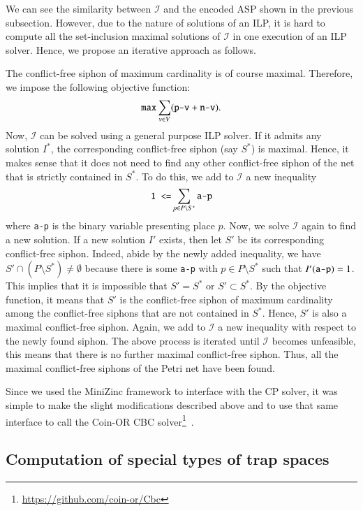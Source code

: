 \documentclass[preprint,12pt]{elsarticle}
\begin{document}
We can see the similarity between \(\mathcal{I}\) and the encoded ASP shown in the previous subsection.
However, due to the nature of solutions of an ILP, it is hard to compute all the set-inclusion maximal solutions of \(\mathcal{I}\) in one execution of an ILP solver.
Hence, we propose an iterative approach as follows.

The conflict-free siphon of maximum cardinality is of course maximal.
Therefore, we impose the following objective function:
\[
  \verb|max| \sum_{v \in V}(\verb|p-v| + \verb|n-v|).
\]
Now, \(\mathcal{I}\) can be solved using a general purpose ILP solver.
If it admits any solution \(I^{*}\), the corresponding conflict-free siphon (say \(S^{*}\)) is maximal.
Hence, it makes sense that it does not need to find any other conflict-free siphon of the net that is strictly contained in \(S^{*}\).
To do this, we add to \(\mathcal{I}\) a new inequality
\[
  \verb|1 <=| \sum_{p \in P \setminus S^{*}} \verb|a-p|
\]
where \verb|a-p| is the binary variable presenting place \(p\).
Now, we solve \(\mathcal{I}\) again to find a new solution.
If a new solution \(I'\) exists, then let \(S'\) be its corresponding conflict-free siphon.
Indeed, abide by the newly added inequality, we have \(S' \cap (P \setminus S^{*}) \neq \emptyset\) because there is some \verb|a-p| with \(p \in P \setminus S^{*}\) such that \(I'(\verb|a-p|) = 1\).
This implies that it is impossible that \(S' = S^{*}\) or \(S' \subset S^{*}\).
By the objective function, it means that \(S'\) is the conflict-free siphon of maximum cardinality among the conflict-free siphons that are not contained in \(S^{*}\).
Hence, \(S'\) is also a maximal conflict-free siphon.
Again, we add to \(\mathcal{I}\) a new inequality with respect to the newly found siphon.
The above process is iterated until \(\mathcal{I}\) becomes unfeasible, this means that there is no further maximal conflict-free siphon.
Thus, all the maximal conflict-free siphons of the Petri net have been found.

Since we used the MiniZinc framework to interface with the CP solver, it was simple to make the slight modifications described above and to use that same interface to call the Coin-OR CBC solver\footnote{\url{https://github.com/coin-or/Cbc}}~\cite{john_forrest_2022_6522795}.

\subsection{Computation of special types of trap spaces}%
\label{subsec:computation_special_ts}
\end{document}
